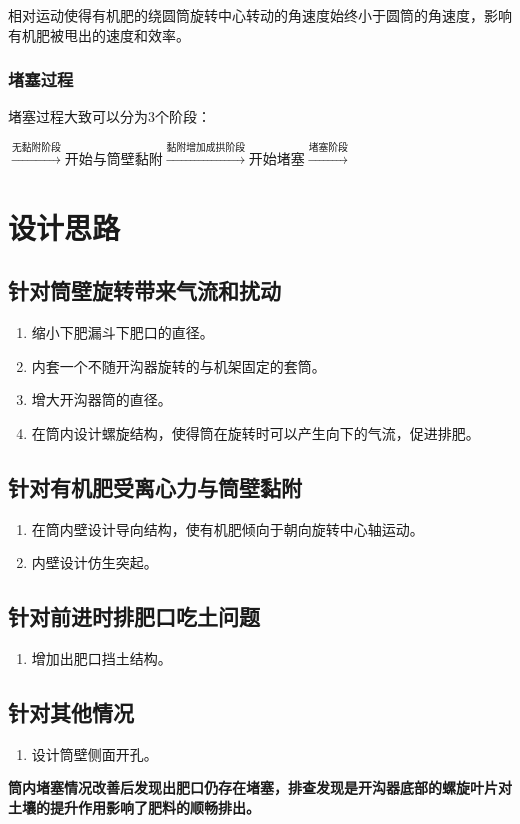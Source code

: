 \documentclass[fontset=windows]{ctexart}
\begin{document}
相对运动使得有机肥的绕圆筒旋转中心转动的角速度始终小于圆筒的角速度，影响有机肥被甩出的速度和效率。

\subsubsection{堵塞过程}

堵塞过程大致可以分为3个阶段：

\(\xrightarrow{\text{无黏附阶段}}\)开始与筒壁黏附\(\xrightarrow{\text{黏附增加成拱阶段}}\)开始堵塞\(\xrightarrow{\text{堵塞阶段}}\)

\section{设计思路}

\subsection{针对筒壁旋转带来气流和扰动}

\begin{enumerate}
	\item 缩小下肥漏斗下肥口的直径。
	\item 内套一个不随开沟器旋转的与机架固定的套筒。
	\item 增大开沟器筒的直径。
	\item 在筒内设计螺旋结构，使得筒在旋转时可以产生向下的气流，促进排肥。
\end{enumerate}

\subsection{针对有机肥受离心力与筒壁黏附}

\begin{enumerate}
	\item 在筒内壁设计导向结构，使有机肥倾向于朝向旋转中心轴运动。
	\item 内壁设计仿生突起。
\end{enumerate}

\subsection{针对前进时排肥口吃土问题}

\begin{enumerate}
	\item 增加出肥口挡土结构。
\end{enumerate}

\subsection{针对其他情况}

\begin{enumerate}
	\item 设计筒壁侧面开孔。
\end{enumerate}

\textbf{筒内堵塞情况改善后发现出肥口仍存在堵塞，排查发现是开沟器底部的螺旋叶片对土壤的提升作用影响了肥料的顺畅排出。}
\end{document}
